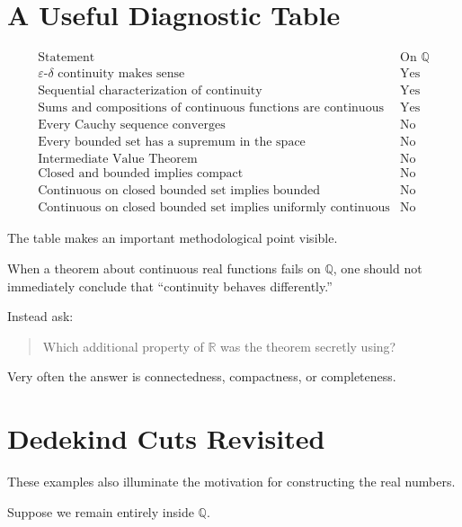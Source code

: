 \documentclass{essay}
\begin{document}
\section{A Useful Diagnostic Table}

\[
  \begin{array}{c|c}
    \text{Statement} & \text{On }\mathbb{Q} \\ \hline
    \varepsilon\text{-}\delta\text{ continuity makes sense}
    & \text{Yes}\\
    \text{Sequential characterization of continuity}
    & \text{Yes}\\
    \text{Sums and compositions of continuous functions are continuous}
    & \text{Yes}\\
    \text{Every Cauchy sequence converges}
    & \text{No}\\
    \text{Every bounded set has a supremum in the space}
    & \text{No}\\
    \text{Intermediate Value Theorem}
    & \text{No}\\
    \text{Closed and bounded implies compact}
    & \text{No}\\
    \text{Continuous on closed bounded set implies bounded}
    & \text{No}\\
    \text{Continuous on closed bounded set implies uniformly continuous}
    & \text{No}
  \end{array}
\]

The table makes an important methodological point visible.

When a theorem about continuous real functions fails on \(\mathbb{Q}\), one
should not immediately conclude that ``continuity behaves differently.''

Instead ask:

\begin{quote}
  Which additional property of \(\mathbb{R}\) was the theorem secretly using?
\end{quote}

Very often the answer is connectedness, compactness, or completeness.

\section{Dedekind Cuts Revisited}

These examples also illuminate the motivation for constructing the real
numbers.

Suppose we remain entirely inside \(\mathbb{Q}\).
\end{document}

